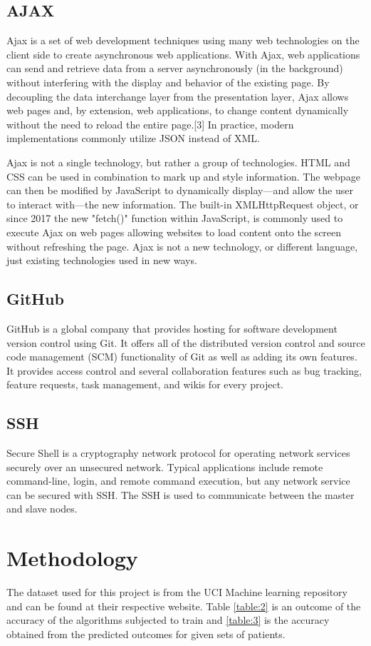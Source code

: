 \documentclass[12pt]{article}
\begin{document}
\subsection{AJAX}
Ajax is a set of web development techniques using many web technologies on the client side to create asynchronous web applications. With Ajax, web applications can send and retrieve data from a server asynchronously (in the background) without interfering with the display and behavior of the existing page. By decoupling the data interchange layer from the presentation layer, Ajax allows web pages and, by extension, web applications, to change content dynamically without the need to reload the entire page.[3] In practice, modern implementations commonly utilize JSON instead of XML.

Ajax is not a single technology, but rather a group of technologies. HTML and CSS can be used in combination to mark up and style information. The webpage can then be modified by JavaScript to dynamically display—and allow the user to interact with—the new information. The built-in XMLHttpRequest object, or since 2017 the new "fetch()" function within JavaScript, is commonly used to execute Ajax on web pages allowing websites to load content onto the screen without refreshing the page. Ajax is not a new technology, or different language, just existing technologies used in new ways.

\subsection{GitHub}
GitHub is a global company that provides hosting for software development version control using Git. It offers all of the distributed version control and source code management (SCM) functionality of Git as well as adding its own features. It provides access control and several collaboration features such as bug tracking, feature requests, task management, and wikis for every project.

\subsection{SSH}
Secure Shell is a cryptography network protocol for operating network services securely over an unsecured network. Typical applications include remote command-line, login, and remote command execution, but any network service can be secured with SSH. The SSH is used to communicate between the master and slave nodes.

\newpage
\section{Methodology}
The dataset used for this project is from the UCI Machine learning repository and can be found at their respective website. Table \ref{table:2} is an outcome of the accuracy of the algorithms subjected to train and \ref{table:3} is the accuracy obtained from the predicted outcomes for given sets of patients.
\end{document}
